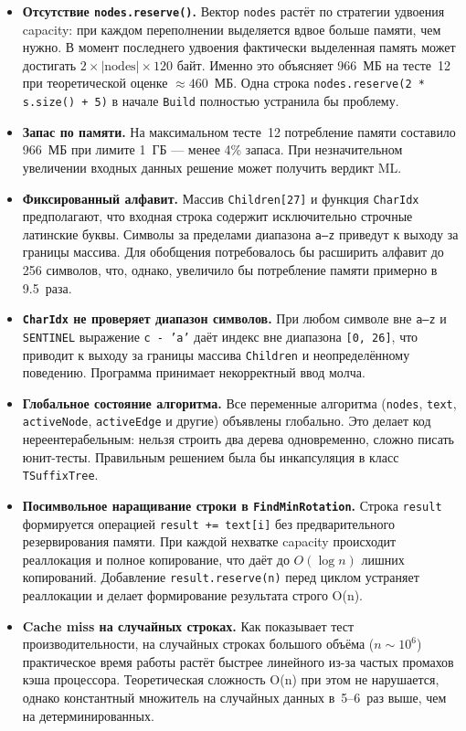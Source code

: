 \documentclass[12pt]{article}
\begin{document}
\begin{itemize}
	\item \textbf{Отсутствие \texttt{nodes.reserve()}.}
	Вектор \texttt{nodes} растёт по стратегии удвоения capacity: при
	каждом переполнении выделяется вдвое больше памяти, чем нужно.
	В момент последнего удвоения фактически выделенная память может
	достигать $2 \times |\text{nodes}| \times 120$ байт. Именно это
	объясняет 966~МБ на тесте~12 при теоретической оценке $\approx 460$~МБ.
	Одна строка \texttt{nodes.reserve(2 * s.size() + 5)} в начале
	\texttt{Build} полностью устранила бы проблему.
	
	\item \textbf{Запас по памяти.}
	На максимальном тесте~12 потребление памяти составило 966~МБ при
	лимите 1~ГБ --- менее 4\% запаса. При незначительном увеличении
	входных данных решение может получить вердикт ML.
	
	\item \textbf{Фиксированный алфавит.}
	Массив \texttt{Children[27]} и функция \texttt{CharIdx} предполагают,
	что входная строка содержит исключительно строчные латинские буквы.
	Символы за пределами диапазона \texttt{a--z} приведут к выходу
	за границы массива. Для обобщения потребовалось бы расширить алфавит
	до 256 символов, что, однако, увеличило бы потребление памяти
	примерно в 9.5~раза.
	
	\item \textbf{\texttt{CharIdx} не проверяет диапазон символов.}
	При любом символе вне \texttt{a--z} и \texttt{SENTINEL} выражение
	\texttt{c - 'a'} даёт индекс вне диапазона \texttt{[0,~26]},
	что приводит к выходу за границы массива \texttt{Children}
	и неопределённому поведению. Программа принимает некорректный
	ввод молча.
	
	\item \textbf{Глобальное состояние алгоритма.}
	Все переменные алгоритма (\texttt{nodes}, \texttt{text},
	\texttt{activeNode}, \texttt{activeEdge} и другие) объявлены
	глобально. Это делает код нереентерабельным: нельзя строить два
	дерева одновременно, сложно писать юнит-тесты. Правильным решением
	была бы инкапсуляция в класс \texttt{TSuffixTree}.
	
	\item \textbf{Посимвольное наращивание строки в \texttt{FindMinRotation}.}
	Строка \texttt{result} формируется операцией \texttt{result += text[i]}
	без предварительного резервирования памяти. При каждой нехватке
	capacity происходит реаллокация и полное копирование, что даёт
	до $O(\log n)$ лишних копирований. Добавление
	\texttt{result.reserve(n)} перед циклом устраняет реаллокации
	и делает формирование результата строго O(n).
	
	\item \textbf{Cache miss на случайных строках.}
	Как показывает тест производительности, на случайных строках
	большого объёма ($n \sim 10^6$) практическое время работы
	растёт быстрее линейного из-за частых промахов кэша процессора.
	Теоретическая сложность O(n) при этом не нарушается, однако
	константный множитель на случайных данных в~5--6~раз выше,
	чем на детерминированных.
\end{itemize}
\end{document}
